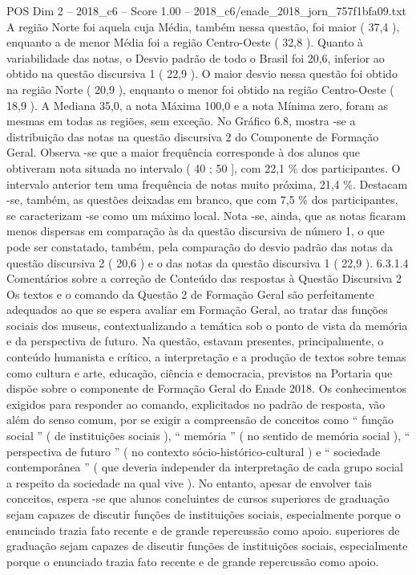 \begin{textsample}{POS Dim 2 – 2018\_c6 – Score 1.00 – 2018\_c6/enade\_2018\_jorn\_757f1bfa09.txt}
A região Norte foi aquela cuja Média, também nessa questão, foi maior ( 37,4 ), enquanto a de menor Média foi a região Centro-Oeste ( 32,8 ).
Quanto à variabilidade das notas, o Desvio padrão de todo o Brasil foi 20,6, inferior ao obtido na questão discursiva 1 ( 22,9 ).
O maior desvio nessa questão foi obtido na região Norte ( 20,9 ), enquanto o menor foi obtido na região Centro-Oeste ( 18,9 ).
A Mediana 35,0, a nota Máxima 100,0 e a nota Mínima zero, foram as mesmas em todas as regiões, sem exceção.
No Gráfico 6.8, mostra -se a distribuição das notas na questão discursiva 2 do Componente de Formação Geral.
Observa -se que a maior frequência corresponde à dos alunos que obtiveram nota situada no intervalo ( 40 ; 50 ], com 22,1 \% dos participantes.
O intervalo anterior tem uma frequência de notas muito próxima, 21,4 \%.
Destacam -se, também, as questões deixadas em branco, que com 7,5 \% dos participantes, se caracterizam -se como um máximo local.
Nota -se, ainda, que as notas ficaram menos dispersas em comparação às da questão discursiva de número 1, o que pode ser constatado, também, pela comparação do desvio padrão das notas da questão discursiva 2 ( 20,6 ) e o das notas da questão discursiva 1 ( 22,9 ). 6.3.1.4 Comentários sobre a correção de Conteúdo das respostas à Questão Discursiva 2 Os textos e o comando da Questão 2 de Formação Geral são perfeitamente adequados ao que se espera avaliar em Formação Geral, ao tratar das funções sociais dos museus, contextualizando a temática sob o ponto de vista da memória e da perspectiva de futuro.
Na questão, estavam presentes, principalmente, o conteúdo humanista e crítico, a interpretação e a produção de textos sobre temas como cultura e arte, educação, ciência e democracia, previstos na Portaria que dispõe sobre o componente de Formação Geral do Enade 2018.
Os conhecimentos exigidos para responder ao comando, explicitados no padrão de resposta, vão além do senso comum, por se exigir a compreensão de conceitos como “ função social ” ( de instituições sociais ), “ memória ” ( no sentido de memória social ), “ perspectiva de futuro ” ( no contexto sócio-histórico-cultural ) e “ sociedade contemporânea ” ( que deveria independer da interpretação de cada grupo social a respeito da sociedade na qual vive ).
No entanto, apesar de envolver tais conceitos, espera -se que alunos concluintes de cursos superiores de graduação sejam capazes de discutir funções de instituições sociais, especialmente porque o enunciado trazia fato recente e de grande repercussão como apoio. superiores de graduação sejam capazes de discutir funções de instituições sociais, especialmente porque o enunciado trazia fato recente e de grande repercussão como apoio.

\end{textsample}
